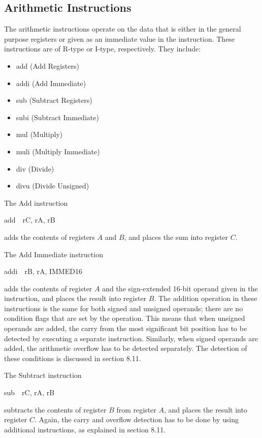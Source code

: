 \documentclass[11pt, twoside, pdftex]{article}
\begin{document}
\subsection{Arithmetic Instructions}

The arithmetic instructions operate on the data that is either in the general purpose registers or 
given as an immediate value in the instruction. These instructions are of R-type or I-type, respectively.
They include: 
\begin{itemize}
\item {\sf add} (Add Registers)
\item {\sf addi} (Add Immediate)
\item {\sf sub} (Subtract Registers)
\item {\sf subi} (Subtract Immediate)
\item {\sf mul} (Multiply)
\item {\sf muli} (Multiply Immediate)
\item {\sf div} (Divide)
\item {\sf divu} (Divide Unsigned)
\end{itemize}
\noindent
The Add instruction
\begin{center}
{\sf add~~rC, rA, rB}
\end{center}
\noindent
adds the contents of registers $A$ and $B$, and places the sum into register $C$.
 

\noindent
The Add Immediate instruction
\begin{center}
{\sf addi~~rB, rA, IMMED16}
\end{center}
\noindent
adds the contents of register $A$ and the sign-extended 16-bit operand given in the instruction,
and places the result into register $B$.
The addition operation in these instructions is the same for both signed and unsigned operands; 
there are no condition flags that are set by the operation. 
This means that when unsigned operands are added, the carry from
the most significant bit position has to be detected by executing a separate instruction.
Similarly, when signed operands are added, the arithmetic overflow has to be detected separately.
The detection of these conditions is discussed in section 8.11.
 

\noindent
The Subtract instruction
\begin{center}
{\sf sub~~rC, rA, rB}
\end{center}
\noindent
subtracts the contents of register $B$ from register $A$, and places the result into register $C$.
Again, the carry and overflow detection has to be done by using additional instructions,
as explained in section 8.11.
 
\end{document}
